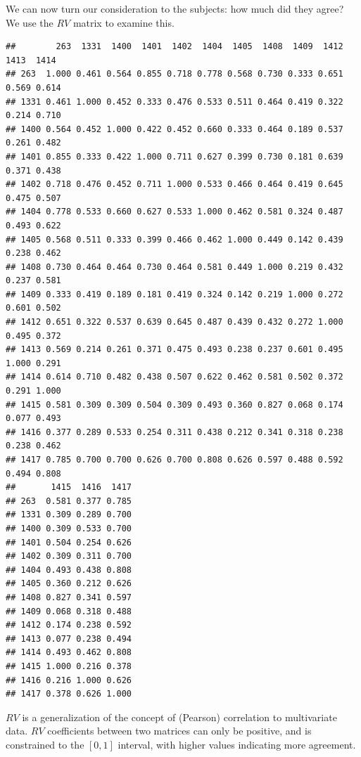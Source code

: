 \documentclass[
]{book}
\newenvironment{Shaded}{\begin{snugshade}}{\end{snugshade}}
\newcommand{\DecValTok}[1]{\textcolor[rgb]{0.00,0.00,0.81}{#1}}
\newcommand{\FunctionTok}[1]{\textcolor[rgb]{0.13,0.29,0.53}{\textbf{#1}}}
\newcommand{\NormalTok}[1]{#1}
\newcommand{\SpecialCharTok}[1]{\textcolor[rgb]{0.81,0.36,0.00}{\textbf{#1}}}
\begin{document}
We can now turn our consideration to the subjects: how much did they agree? We use the \(RV\) matrix to examine this.

\begin{Shaded}
\end{Shaded}

\begin{verbatim}
##        263  1331  1400  1401  1402  1404  1405  1408  1409  1412  1413  1414
## 263  1.000 0.461 0.564 0.855 0.718 0.778 0.568 0.730 0.333 0.651 0.569 0.614
## 1331 0.461 1.000 0.452 0.333 0.476 0.533 0.511 0.464 0.419 0.322 0.214 0.710
## 1400 0.564 0.452 1.000 0.422 0.452 0.660 0.333 0.464 0.189 0.537 0.261 0.482
## 1401 0.855 0.333 0.422 1.000 0.711 0.627 0.399 0.730 0.181 0.639 0.371 0.438
## 1402 0.718 0.476 0.452 0.711 1.000 0.533 0.466 0.464 0.419 0.645 0.475 0.507
## 1404 0.778 0.533 0.660 0.627 0.533 1.000 0.462 0.581 0.324 0.487 0.493 0.622
## 1405 0.568 0.511 0.333 0.399 0.466 0.462 1.000 0.449 0.142 0.439 0.238 0.462
## 1408 0.730 0.464 0.464 0.730 0.464 0.581 0.449 1.000 0.219 0.432 0.237 0.581
## 1409 0.333 0.419 0.189 0.181 0.419 0.324 0.142 0.219 1.000 0.272 0.601 0.502
## 1412 0.651 0.322 0.537 0.639 0.645 0.487 0.439 0.432 0.272 1.000 0.495 0.372
## 1413 0.569 0.214 0.261 0.371 0.475 0.493 0.238 0.237 0.601 0.495 1.000 0.291
## 1414 0.614 0.710 0.482 0.438 0.507 0.622 0.462 0.581 0.502 0.372 0.291 1.000
## 1415 0.581 0.309 0.309 0.504 0.309 0.493 0.360 0.827 0.068 0.174 0.077 0.493
## 1416 0.377 0.289 0.533 0.254 0.311 0.438 0.212 0.341 0.318 0.238 0.238 0.462
## 1417 0.785 0.700 0.700 0.626 0.700 0.808 0.626 0.597 0.488 0.592 0.494 0.808
##       1415  1416  1417
## 263  0.581 0.377 0.785
## 1331 0.309 0.289 0.700
## 1400 0.309 0.533 0.700
## 1401 0.504 0.254 0.626
## 1402 0.309 0.311 0.700
## 1404 0.493 0.438 0.808
## 1405 0.360 0.212 0.626
## 1408 0.827 0.341 0.597
## 1409 0.068 0.318 0.488
## 1412 0.174 0.238 0.592
## 1413 0.077 0.238 0.494
## 1414 0.493 0.462 0.808
## 1415 1.000 0.216 0.378
## 1416 0.216 1.000 0.626
## 1417 0.378 0.626 1.000
\end{verbatim}

\(RV\) is a generalization of the concept of (Pearson) correlation to multivariate data. \(RV\) coefficients between two matrices can only be positive, and is constrained to the \([0,1]\) interval, with higher values indicating more agreement.
\end{document}
